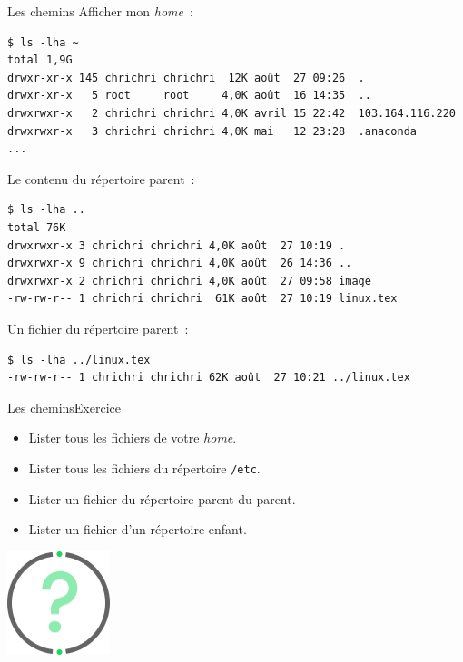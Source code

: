 \documentclass{beamer}
\begin{document}
    \begin{frame}[fragile]{Les chemins}
        Afficher mon \textit{home}~:
        \begin{lstlisting}
$ ls -lha ~
total 1,9G
drwxr-xr-x 145 chrichri chrichri  12K août  27 09:26  .
drwxr-xr-x   5 root     root     4,0K août  16 14:35  ..
drwxrwxr-x   2 chrichri chrichri 4,0K avril 15 22:42  103.164.116.220
drwxrwxr-x   3 chrichri chrichri 4,0K mai   12 23:28  .anaconda
...
        \end{lstlisting}
        Le contenu du répertoire parent~:
        \begin{lstlisting}
$ ls -lha ..
total 76K
drwxrwxr-x 3 chrichri chrichri 4,0K août  27 10:19 .
drwxrwxr-x 9 chrichri chrichri 4,0K août  26 14:36 ..
drwxrwxr-x 2 chrichri chrichri 4,0K août  27 09:58 image
-rw-rw-r-- 1 chrichri chrichri  61K août  27 10:19 linux.tex
        \end{lstlisting}
        Un fichier du répertoire parent~:
        \begin{lstlisting}
$ ls -lha ../linux.tex
-rw-rw-r-- 1 chrichri chrichri 62K août  27 10:21 ../linux.tex
        \end{lstlisting}
    \end{frame}

    \begin{frame}{Les chemins}{Exercice \execcounterdispinc}
        \begin{itemize}
            \item Lister tous les fichiers de votre \textit{home}.
            \item Lister tous les fichiers du répertoire \lstinline{/etc}.
            \item Lister un fichier du répertoire parent du parent.
            \item Lister un fichier d'un répertoire enfant.
        \end{itemize}
        \begin{center}
            \includegraphics[width=3cm]{image/question-mark}
        \end{center}
    \end{frame}
\end{document}
